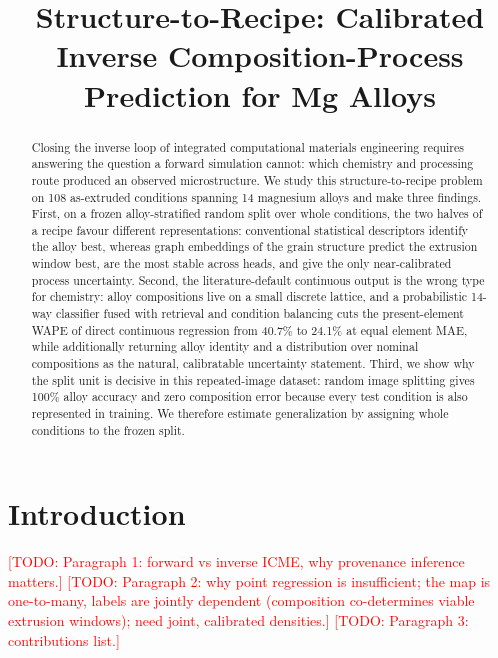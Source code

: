 \documentclass{article}
\title{Structure-to-Recipe: Calibrated Inverse Composition-Process Prediction
for Mg Alloys}
\author{%
  \todo{Author list and affiliations}%
}
\newcommand{\todo}[1]{\textcolor{red}{[TODO: #1]}}
\begin{document}
\maketitle

\begin{abstract}
Closing the inverse loop of integrated computational materials engineering
requires answering the question a forward simulation cannot: which chemistry
and processing route produced an observed microstructure. We study this
structure-to-recipe problem on 108 as-extruded conditions spanning 14
magnesium alloys and make three findings. First, on a frozen
alloy-stratified random split over whole conditions, the two halves of a
recipe favour different representations: conventional statistical descriptors
identify the alloy best, whereas graph embeddings of the grain structure
predict the extrusion window best, are the most stable across heads, and give
the only near-calibrated process uncertainty. Second, the literature-default
continuous output is the wrong type for chemistry: alloy compositions live on
a small discrete lattice, and a probabilistic 14-way classifier fused with
retrieval and condition balancing cuts the present-element WAPE of direct
continuous regression from 40.7\% to 24.1\% at equal element MAE, while
additionally returning alloy identity and a distribution over nominal
compositions as the natural, calibratable uncertainty statement. Third, we
show why the split unit is decisive in this repeated-image dataset: random
image splitting gives 100\% alloy accuracy and zero composition error because
every test condition is also represented in training. We therefore estimate
generalization by assigning whole conditions to the frozen split.
\end{abstract}

\section{Introduction}
\label{sec:intro}
\todo{Paragraph 1: forward vs inverse ICME, why provenance inference matters.}
\todo{Paragraph 2: why point regression is insufficient; the map is one-to-many,
labels are jointly dependent (composition co-determines viable extrusion
windows); need joint, calibrated densities.}
\todo{Paragraph 3: contributions list.}
\end{document}
